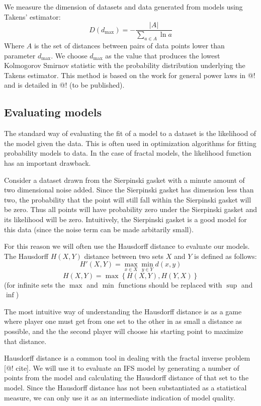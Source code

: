 \documentclass[11pt]{article}
\theoremstyle{definition}
\begin{document}
We measure the dimension of datasets and data generated from models using Takens' estimator:
\[
D(d_{\mbox{max}}) = -\frac{|A|}{\sum_{a \in A} \ln a} 
\]
Where $A$ is the set of distances between pairs of data points lower than parameter $d_{\mbox{max}}$. We choose $d_{\mbox{max}}$ as the value that produces the lowest Kolmogorov Smirnov statistic with the probability distribution underlying the Takens estimator. This method is based on the work for general power laws in @! and is detailed in @! (to be published).

\subsection{Evaluating models}

The standard way of evaluating the fit of a model to a dataset is the likelihood of the model given the data. This is often used in optimization algorithms for fitting probability models to data. In the case of fractal models, the likelihood function has an important drawback. 

Consider a dataset drawn from the Sierpinski gasket with a minute amount of two dimensional noise added. Since the Sierpinski gasket has dimension less than two, the probability that the point will still fall within the Sierpinski gasket will be zero. Thus all points will have probability zero under the Sierpinski gasket and its likelihood will be zero. Intuitively, the Sierpinski gasket is a good model for this data (since the noise term can be made arbitarily small).

For this reason we will often use the Hausdorff distance to evaluate our models. The Hausdorff $H(X, Y)$ distance between two sets $X$ and $Y$ is defined as follows:
\[ 
H'(X, Y) = \max_{x\in X} \min_{y\in Y} d(x, y) 
\]
\[
H(X, Y) = \max\left \{H(X, Y), H(Y, X)\right\}
\]
 (for infinite sets the $\max$ and $\min$ functions should be replaced with $\sup$ and $\inf$)
 
The most intuitive way of understanding the Hausdorff distance is as a game where player one must get from one set to the other in as small a distance as possible, and the the second player will choose his starting point to maximize that distance.

Hausdorff distance is a common tool in dealing with the fractal inverse problem [@! cite]. We will use it to evaluate an IFS model by generating a number of points from the model and calculating the Hausdorff distance of that set to the model. Since the Hausdorff distance has not been substantiated as a statistical measure, we can only use it as an intermediate indication of model quality. 
\end{document}
